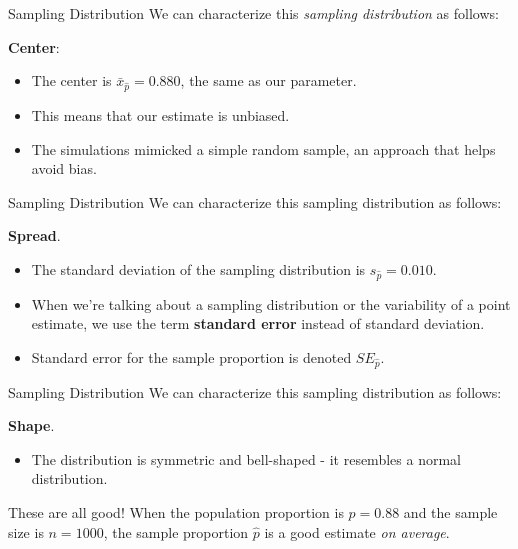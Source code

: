 \begin{frame}{Sampling Distribution}
    We can characterize this \textit{sampling distribution} as follows:
    
    \vspace{12pt}\textbf{Center}:
    \begin{itemize}
        \item  The center is $\bar{x}_{\hat{p}}=0.880$, the same as our parameter.
        \item This means that our estimate is unbiased.
        \item The simulations mimicked a simple random sample, an approach that helps avoid bias.
    \end{itemize}
\end{frame}

\begin{frame}{Sampling Distribution}
    We can characterize this sampling distribution as follows:
    
    \vspace{12pt}\textbf{Spread}. 
    \begin{itemize}
        \item The standard deviation of the sampling distribution is $s_{\hat{p}} = 0.010$.
        \item When we’re talking about a sampling distribution or the variability of a point estimate, we use the term \textbf{standard error} instead of standard deviation. 
        \item Standard error for the sample proportion is denoted $SE_{\hat{p}}$.
    \end{itemize}
\end{frame}

\begin{frame}{Sampling Distribution}
    We can characterize this sampling distribution as follows:
    
    \vspace{12pt}\textbf{Shape}. 
    \begin{itemize}
        \item The distribution is symmetric and bell-shaped - it resembles a normal distribution.
    \end{itemize}
    
    \vspace{12pt}These are all good! When the population proportion is $p = 0.88$ and the sample size is $n = 1000$, the sample proportion $\hat{p}$ is a good estimate \textit{on average}.
\end{frame}


